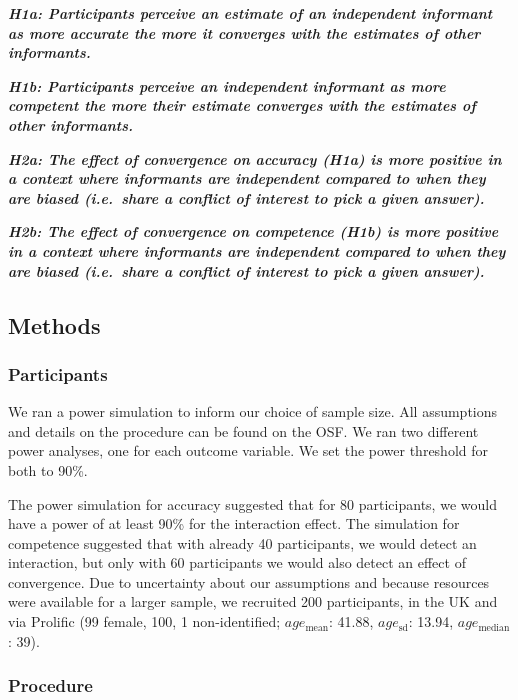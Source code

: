 \documentclass[
  doc,floatsintext]{apa6}
\begin{document}
\textbf{\emph{H1a: Participants perceive an estimate of an independent informant as more accurate the more it converges with the estimates of other informants.}}

\textbf{\emph{H1b: Participants perceive an independent informant as more competent the more their estimate converges with the estimates of other informants.}}

\textbf{\emph{H2a: The effect of convergence on accuracy (H1a) is more positive in a context where informants are independent compared to when they are biased (i.e.~share a conflict of interest to pick a given answer).}}

\textbf{\emph{H2b: The effect of convergence on competence (H1b) is more positive in a context where informants are independent compared to when they are biased (i.e.~share a conflict of interest to pick a given answer).}}

\subsection{Methods}\label{methods-4}

\subsubsection{Participants}\label{participants-4}

We ran a power simulation to inform our choice of sample size. All assumptions and details on the procedure can be found on the OSF. We ran two different power analyses, one for each outcome variable. We set the power threshold for both to 90\%.

The power simulation for accuracy suggested that for 80 participants, we would have a power of at least 90\% for the interaction effect. The simulation for competence suggested that with already 40 participants, we would detect an interaction, but only with 60 participants we would also detect an effect of convergence. Due to uncertainty about our assumptions and because resources were available for a larger sample, we recruited 200 participants, in the UK and via Prolific (99 female, 100, 1 non-identified; \(age_\text{mean}\): 41.88, \(age_\text{sd}\): 13.94, \(age_\text{median}\): 39).

\subsubsection{Procedure}\label{procedure-3}
\end{document}
